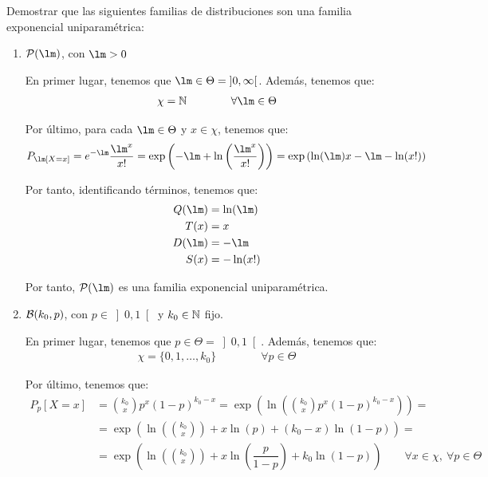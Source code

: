 \begin{ejemplo}
    Demostrar que las siguientes familias de distribuciones son una familia exponencial uniparamétrica:
    \begin{enumerate}
        \item $\cc{P}(\lm)$, con $\lm > 0$
        
        En primer lugar, tenemos que $\lm\in \Theta = \left]0, \infty\right[$. Además, tenemos que:
        \begin{align*}
            \chi = \bb{N} \qquad \qquad \forall \lm\in\Theta
        \end{align*}

        Por último, para cada $\lm\in\Theta$ y $x\in\chi$, tenemos que:
        \begin{align*}
            P_\lm[X=x] = e^{-\lm}\dfrac{\lm^x}{x!}
            = \exp\left(-\lm + \ln\left(\dfrac{\lm^x}{x!}\right)\right)
            = \exp\left(\ln(\lm)x - \lm - \ln(x!)\right)
        \end{align*}

        Por tanto, identificando términos, tenemos que:
        \begin{align*}
            Q(\lm) &= \ln(\lm) \\
            T(x) &= x \\
            D(\lm) &=- \lm \\
            S(x) &=- \ln(x!)
        \end{align*}

        Por tanto, $\cc{P}(\lm)$ es una familia exponencial uniparamétrica.
        \item $\mathcal{B}(k_0, p)$, con $p\in\left]0, 1\right[$ y $k_0\in\mathbb{N}$ fijo.
        
        En primer lugar, tenemos que $p\in \Theta = \left]0, 1\right[$. Además, tenemos que:
        \begin{align*}
            \chi = \{0, 1, \ldots, k_0\}\qquad \qquad \forall p\in\Theta
        \end{align*}

        Por último, tenemos que:
        \begin{align*}
            P_p[X=x] &= \binom{k_0}{x} p^x (1-p)^{k_0-x}
            = \exp\left(\ln\left(\binom{k_0}{x} p^x (1-p)^{k_0-x}\right)\right)
            =\\&= \exp\left(\ln\left(\binom{k_0}{x}\right) + x\ln(p) + (k_0-x)\ln(1-p)\right)
            =\\&= \exp\left(\ln\left(\binom{k_0}{x}\right) + x\ln\left(\dfrac{p}{1-p}\right) + k_0\ln(1-p)\right)
            \qquad \forall x\in\chi,\ \forall p\in\Theta
        \end{align*}


\end{enumerate}
\end{ejemplo}
